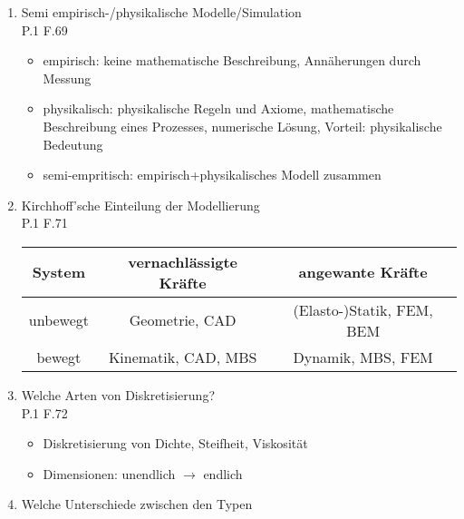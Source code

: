 \documentclass[10pt,a4paper,fleqn]{article}
\begin{document}
\begin{enumerate}
\section{Virtuelle Produktentwicklung}
\subsection{CAx - Methoden}
	\item Semi empirisch-/physikalische Modelle/Simulation\\
		P.1 F.69
		\begin{itemize}
			\item empirisch: keine mathematische Beschreibung, Annäherungen durch Messung
			\item physikalisch: physikalische Regeln und Axiome, mathematische Beschreibung eines Prozesses, numerische Lösung, Vorteil: physikalische Bedeutung
			\item semi-empritisch: empirisch+physikalisches Modell zusammen
		\end{itemize}
	\item Kirchhoff'sche Einteilung der Modellierung\\
		P.1 F.71
		\begin{center}
			\begin{tabular}{|c|c|c|}
			\hline 
			System & vernachlässigte Kräfte & angewante Kräfte \\ 
			\hline 
			unbewegt & Geometrie, CAD & (Elasto-)Statik, FEM, BEM \\ 
			\hline
			bewegt & Kinematik, CAD, MBS & Dynamik, MBS, FEM \\ 
			\hline 
			\end{tabular} 
		\end{center}
	\item Welche Arten von Diskretisierung?\\
		P.1 F.72
			\begin{itemize}
				\item Diskretisierung von Dichte, Steifheit, Viskosität
				\item Dimensionen: unendlich $\rightarrow$ endlich
			\end{itemize}
	\item Welche Unterschiede zwischen den Typen
	

\end{enumerate}
\end{document}
